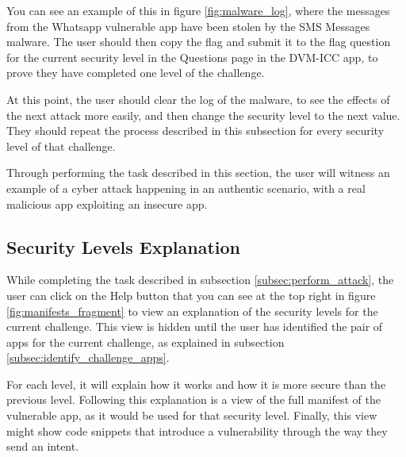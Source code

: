     You can see an example of this in figure \ref{fig:malware_log}, where the messages from the Whatsapp vulnerable app have been stolen by the SMS Messages malware. The user should then copy the flag and submit it to the flag question for the current security level in the Questions page in the DVM-ICC app, to prove they have completed one level of the challenge. 
    
    At this point, the user should clear the log of the malware, to see the effects of the next attack more easily, and then change the security level to the next value. They should repeat the process described in this subsection for every security level of that challenge.
    
    Through performing the task described in this section, the user will witness an example of a cyber attack happening in an authentic scenario, with a real malicious app exploiting an insecure app. 
    
    \subsection{Security Levels Explanation}
        \label{subsec:security_levels_explanation}
        
    While completing the task described in subsection \ref{subsec:perform_attack}, the user can click on the Help button that you can see at the top right in figure \ref{fig:manifests_fragment} to view an explanation of the security levels for the current challenge. This view is hidden until the user has identified the pair of apps for the current challenge, as explained in subsection \ref{subsec:identify_challenge_apps}.
    
    For each level, it will explain how it works and how it is more secure than the previous level. Following this explanation is a view of the full manifest of the vulnerable app, as it would be used for that security level. Finally, this view might show code snippets that introduce a vulnerability through the way they send an intent.
    
